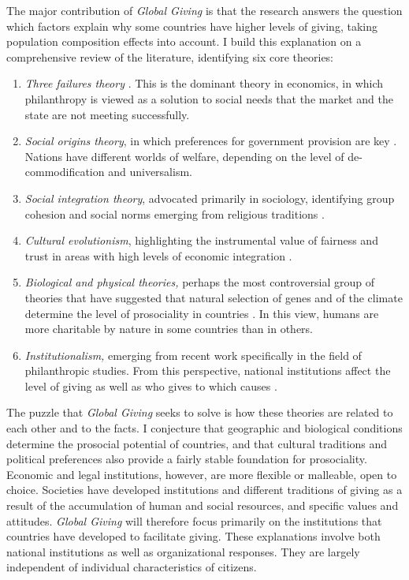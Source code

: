 \documentclass[twocolumn, serif, rga, numeric]{jote-article}
\begin{document}
The major contribution of \emph{Global Giving} is that the research answers the question which factors explain why some countries have higher levels of giving, taking population composition effects into account. I build this explanation on a comprehensive review of the literature, identifying six core theories: 
\begin{enumerate}
\item   \emph{Three failures theory} \cite{Steinberg2006, Weisbrod1977}. This is   the dominant theory in economics, in which philanthropy is viewed as a   solution to social needs that the market and the state are not meeting   successfully.
\item   \emph{Social origins theory}, in which preferences for government   provision are key \cite{Esping-Andersen1990}. Nations have different   worlds of welfare, depending on the level of de-commodification and   universalism.
\item   \emph{Social integration theory}, advocated primarily in sociology,   identifying group cohesion and social norms emerging from religious   traditions \cite{Bekkers2008}.
\item   \emph{Cultural evolutionism}, highlighting the instrumental value of   fairness and trust in areas with high levels of economic   integration \cite{Henrich2005}.
\item   \emph{Biological and physical theories,} perhaps the most   controversial group of theories that have suggested that natural   selection of genes and of the climate determine the level of   prosociality in countries \cite{Minkov2017, Chiao2010, VanLange2017, Proto2017, Bekkers2016b, VandeVliert2004}. In this   view, humans are more charitable by nature in some countries than in   others.
\item   \emph{Institutionalism,} emerging from recent work specifically in the   field of philanthropic studies. From this perspective, national   institutions affect the level of giving as well as who gives to which causes \cite{Healy2000, Healy2004, Wiepking2015a}.
\end{enumerate}

The puzzle that \emph{Global Giving} seeks to solve is how these theories are related to each other and to the facts. I conjecture that geographic and biological conditions determine the prosocial potential of countries, and that cultural traditions and political preferences also provide a fairly stable foundation for prosociality. Economic and legal institutions, however, are more flexible or malleable, open to choice. Societies have developed institutions and different traditions of giving as a result of the accumulation of human and social resources, and specific values and attitudes. \emph{Global Giving} will therefore focus primarily on the institutions that countries have developed to facilitate giving. These explanations involve both national institutions as well as organizational responses. They are largely independent of individual characteristics of citizens.
\end{document}
